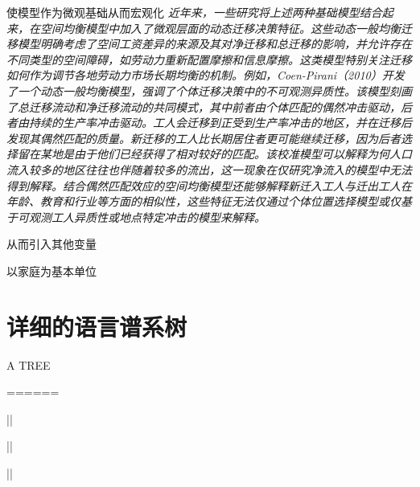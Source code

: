 \documentclass[
  a4paper,
  zihao=-4,
  fontset=mac,
  AutoFakeBold,
  AutoFakeSlant,
  oneside]{ctexbook}
\begin{document}
使模型作为微观基础从而宏观化
\textit{近年来，一些研究将上述两种基础模型结合起来，在空间均衡模型中加入了微观层面的动态迁移决策特征。这些动态一般均衡迁移模型明确考虑了空间工资差异的来源及其对净迁移和总迁移的影响，并允许存在不同类型的空间障碍，如劳动力重新配置摩擦和信息摩擦。这类模型特别关注迁移如何作为调节各地劳动力市场长期均衡的机制。例如，Coen-Pirani（2010）开发了一个动态一般均衡模型，强调了个体迁移决策中的不可观测异质性。该模型刻画了总迁移流动和净迁移流动的共同模式，其中前者由个体匹配的偶然冲击驱动，后者由持续的生产率冲击驱动。工人会迁移到正受到生产率冲击的地区，并在迁移后发现其偶然匹配的质量。新迁移的工人比长期居住者更可能继续迁移，因为后者选择留在某地是由于他们已经获得了相对较好的匹配。该校准模型可以解释为何人口流入较多的地区往往也伴随着较多的流出，这一现象在仅研究净流入的模型中无法得到解释。结合偶然匹配效应的空间均衡模型还能够解释新迁入工人与迁出工人在年龄、教育和行业等方面的相似性，这些特征无法仅通过个体位置选择模型或仅基于可观测工人异质性或地点特定冲击的模型来解释。}

从而引入其他变量

以家庭为基本单位


\newpage
\appendix

\chapter{详细的语言谱系树}

A TREE

======

      ||
      
      ||
      
      ||

\newpage
%
%
%
\printbibliography[heading=bibliography,title=参考文献]
\end{document}

